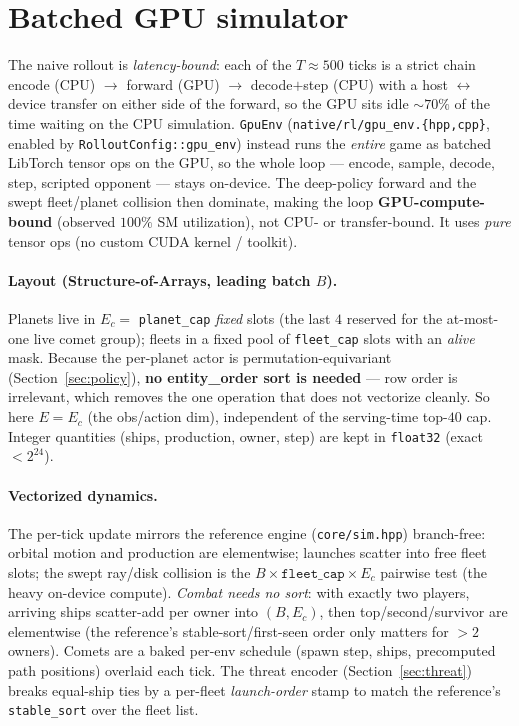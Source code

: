 \documentclass[11pt]{article}
\begin{document}
\section{Batched GPU simulator}\label{sec:gpuenv}
The naive rollout is \emph{latency-bound}: each of the $T{\approx}500$ ticks is a strict chain
\textsf{encode (CPU)} $\to$ \textsf{forward (GPU)} $\to$ \textsf{decode$+$step (CPU)} with a host
$\leftrightarrow$ device transfer on either side of the forward, so the GPU sits idle ${\sim}70\%$
of the time waiting on the CPU simulation. \texttt{GpuEnv} (\texttt{native/rl/gpu\_env.\{hpp,cpp\}},
enabled by \texttt{RolloutConfig::gpu\_env}) instead runs the \emph{entire} game as batched
LibTorch tensor ops on the GPU, so the whole loop --- encode, sample, decode, step, scripted
opponent --- stays on-device. The deep-policy forward and the swept fleet/planet collision then
dominate, making the loop \textbf{GPU-compute-bound} (observed $100\%$ SM utilization), not
CPU- or transfer-bound. It uses \emph{pure} tensor ops (no custom CUDA kernel / toolkit).

\paragraph{Layout (Structure-of-Arrays, leading batch $B$).} Planets live in $E_c=$
\texttt{planet\_cap} \emph{fixed} slots (the last $4$ reserved for the at-most-one live comet
group); fleets in a fixed pool of \texttt{fleet\_cap} slots with an \emph{alive} mask. Because the
per-planet actor is permutation-equivariant (Section~\ref{sec:policy}), \textbf{no
\textsf{entity\_order} sort is needed} --- row order is irrelevant, which removes the one operation
that does not vectorize cleanly. So here $E=E_c$ (the obs/action dim), independent of the
serving-time top-$40$ cap. Integer quantities (ships, production, owner, step) are kept in
\texttt{float32} (exact $<2^{24}$).

\paragraph{Vectorized dynamics.} The per-tick update mirrors the reference engine
(\texttt{core/sim.hpp}) branch-free: orbital motion and production are elementwise; launches scatter
into free fleet slots; the swept ray/disk collision is the $B\times\texttt{fleet\_cap}\times E_c$
pairwise test (the heavy on-device compute). \emph{Combat needs no sort}: with exactly two players,
arriving ships scatter-add per owner into $(B,E_c)$, then top/second/survivor are elementwise
(the reference's stable-sort/first-seen order only matters for ${>}2$ owners). Comets are a baked
per-env schedule (spawn step, ships, precomputed path positions) overlaid each tick. The threat
encoder (Section~\ref{sec:threat}) breaks equal-ship ties by a per-fleet \emph{launch-order} stamp
to match the reference's \texttt{stable\_sort} over the fleet list.
\end{document}
